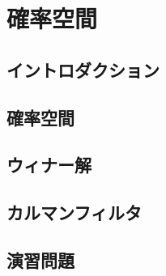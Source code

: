 \documentclass[../../main]{subfiles}
\begin{document}
\chapter{確率空間}
\label{chapter:probability_space}

\section{イントロダクション}

\section{確率空間}

\section{ウィナー解}

\section{カルマンフィルタ}

\section{演習問題}
\end{document}
